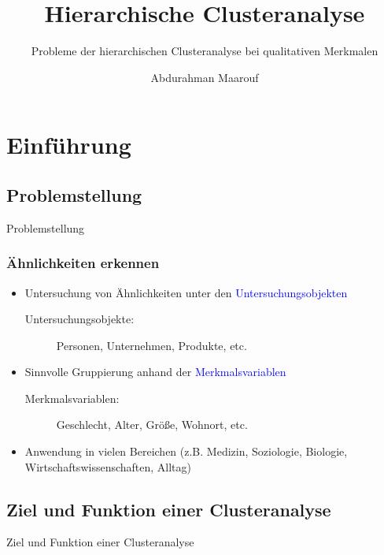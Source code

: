 \documentclass{beamer}
\title{Hierarchische Clusteranalyse}
\subtitle{Probleme der hierarchischen Clusteranalyse bei qualitativen Merkmalen}
\author[A. Maarouf]{Abdurahman Maarouf\inst{1}}
\institute[Uni Bonn]{
 \inst{1}Universität Bonn}
\begin{document}
\frame{\titlepage}






\section{Einführung}

\subsection{Problemstellung}

\begin{frame}
 \centerline{Problemstellung}
\end{frame}

\begin{frame}
 \frametitle{Ähnlichkeiten erkennen}

 \begin{itemize}
  \item Untersuchung von Ähnlichkeiten unter den \textcolor{blue}{Untersuchungsobjekten}
  \begin {description}
   \item [ Untersuchungsobjekte: ] Personen, Unternehmen, Produkte, etc.
  \end{description}
  \item Sinnvolle Gruppierung anhand der \textcolor{blue}{Merkmalsvariablen}
  \begin {description}
   \item [ Merkmalsvariablen: ] Geschlecht, Alter, Größe, Wohnort, etc.
  \end{description}
  \item Anwendung in vielen Bereichen (z.B. Medizin, Soziologie, Biologie, Wirtschaftswissenschaften, Alltag)
 \end{itemize}
\end{frame}

\subsection{Ziel und Funktion einer Clusteranalyse}

\begin{frame}
 \centerline{Ziel und Funktion einer Clusteranalyse}
\end{frame}
\end{document}
